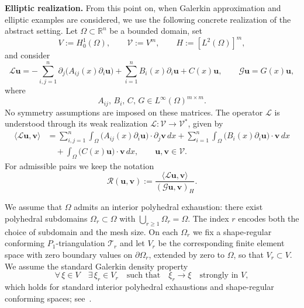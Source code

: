 \documentclass[10pt,a4paper]{amsart}
\begin{document}
\medskip

\noindent\textbf{Elliptic realization.}\;
From this point on, when Galerkin approximation and elliptic examples are
considered, we use the following concrete realization of the abstract setting.
Let \(\Omega\subset\mathbb R^n\) be a bounded domain, set
\[
V:=H_0^1(\Omega),
\qquad
\mathcal V:=V^m,
\qquad
H:=[L^2(\Omega)]^m,
\]
and consider
\begin{equation}\label{eq:L_system}
	\mathcal L\mathbf u
	=
	-\sum_{i,j=1}^n \partial_j\!\bigl(A_{ij}(x)\partial_i\mathbf u\bigr)
	+
	\sum_{i=1}^n B_i(x)\partial_i\mathbf u
	+
	C(x)\mathbf u,
	\qquad
	\mathcal G\mathbf u=G(x)\mathbf u ,
\end{equation}
where
\[
A_{ij},\,B_i,\,C,\,G\in L^\infty(\Omega)^{m\times m}.
\]
No symmetry assumptions are imposed on these matrices. The operator
\(\mathcal L\) is understood through its weak realization
\(\mathcal L:\mathcal V\to\mathcal V^*\), given by
\[
\begin{aligned}
	\langle \mathcal L\mathbf u,\mathbf v\rangle
	&=
	\sum_{i,j=1}^n
	\int_\Omega
	\bigl(A_{ij}(x)\partial_i\mathbf u\bigr)\cdot
	\partial_j\mathbf v\,dx
	+
	\sum_{i=1}^n
	\int_\Omega
	\bigl(B_i(x)\partial_i\mathbf u\bigr)\cdot
	\mathbf v\,dx                                      \\
	&\quad
	+
	\int_\Omega
	\bigl(C(x)\mathbf u\bigr)\cdot \mathbf v\,dx,
	\qquad \mathbf u,\mathbf v\in\mathcal V .
\end{aligned}
\]
For admissible pairs we keep the notation
\begin{equation}\label{eq:Rel}
	\mathcal R(\mathbf u,\mathbf v)
	:=
	\frac{\langle \mathcal L\mathbf u,\mathbf v\rangle}
	{(\mathcal G\mathbf u,\mathbf v)_H}.
\end{equation}

We assume that $\Omega$ admits an interior polyhedral exhaustion: there exist
polyhedral subdomains $\Omega_r\subset\Omega$ with $\bigcup_{r\ge1}\Omega_r=\Omega$.
The index $r$ encodes both the choice of subdomain and the mesh size. On each
$\Omega_r$ we fix a shape-regular conforming $P_1$-triangulation $\mathcal{T}_r$
and let $V_r$ be the corresponding finite element space with zero boundary values
on $\partial\Omega_r$, extended by zero to $\Omega$, so that $V_r\subset V$. We
assume the standard Galerkin density property
\begin{equation}\label{eq:Wr-density}
	\forall\,\xi\in V \quad \exists\,\xi_r\in V_r \quad\text{such that}\quad
	\xi_r\longrightarrow\xi \quad\text{strongly in }V,
\end{equation}
which holds for standard interior polyhedral exhaustions and shape-regular
conforming spaces; see~\cite{ciaretRav,ciaret,Ern}.
\end{document}
